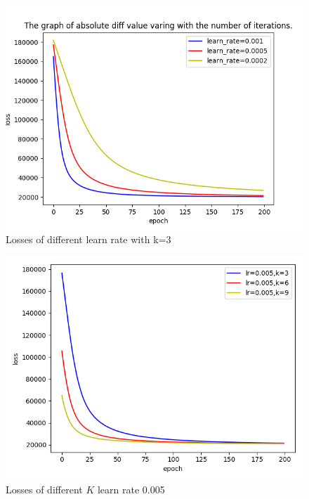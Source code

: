 \documentclass[journal, a4paper]{IEEEtran}
\begin{document}
\begin{figure}[!htb]
	\begin{center}
	\includegraphics[width=\columnwidth]{mf_k3}
	\caption{Losses of different learn rate with k=3}
	\label{fig:mf_k3}
	\end{center}
\end{figure}

\begin{figure}[!htb]
	\begin{center}
	\includegraphics[width=\columnwidth]{mf_k_compare}
	\caption{Losses of different $K$ learn rate 0.005}
	\label{fig:mf_k_compare}
	\end{center}
\end{figure}
\end{document}
